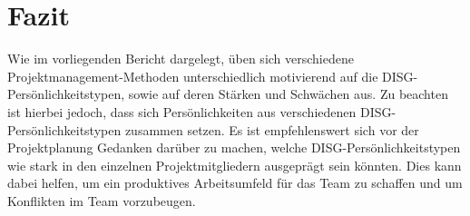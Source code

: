 \documentclass[twocolumn,10pt]{asme2ej}
\begin{document}
\section{Fazit}\label{sec:3}

Wie im vorliegenden Bericht dargelegt, üben sich verschiedene Projektmanagement-Methoden unterschiedlich motivierend auf die DISG-Persönlichkeitstypen, sowie auf deren Stärken und Schwächen aus. Zu beachten ist hierbei jedoch, dass sich Persönlichkeiten aus verschiedenen DISG-Persönlichkeitstypen zusammen setzen. Es ist empfehlenswert sich vor der Projektplanung Gedanken darüber zu machen, welche DISG-Persönlichkeitstypen wie stark in den einzelnen Projektmitgliedern ausgeprägt sein könnten. Dies kann dabei helfen, um ein produktives Arbeitsumfeld für das Team zu schaffen und um Konflikten im Team vorzubeugen.




\end{document}

